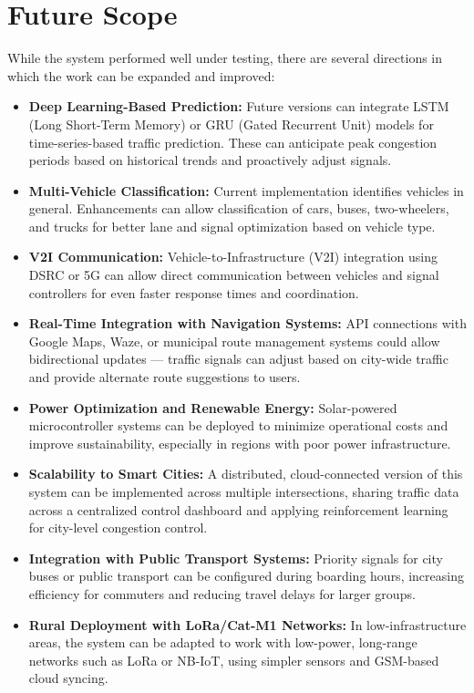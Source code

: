 \documentclass[12pt]{report}
\begin{document}
\section{Future Scope}

While the system performed well under testing, there are several directions in which the work can be expanded and improved:

\begin{itemize}
    \item \textbf{Deep Learning-Based Prediction:} Future versions can integrate LSTM (Long Short-Term Memory) or GRU (Gated Recurrent Unit) models for time-series-based traffic prediction. These can anticipate peak congestion periods based on historical trends and proactively adjust signals.

    \item \textbf{Multi-Vehicle Classification:} Current implementation identifies vehicles in general. Enhancements can allow classification of cars, buses, two-wheelers, and trucks for better lane and signal optimization based on vehicle type.

    \item \textbf{V2I Communication:} Vehicle-to-Infrastructure (V2I) integration using DSRC or 5G can allow direct communication between vehicles and signal controllers for even faster response times and coordination.

    \item \textbf{Real-Time Integration with Navigation Systems:} API connections with Google Maps, Waze, or municipal route management systems could allow bidirectional updates — traffic signals can adjust based on city-wide traffic and provide alternate route suggestions to users.

    \item \textbf{Power Optimization and Renewable Energy:} Solar-powered microcontroller systems can be deployed to minimize operational costs and improve sustainability, especially in regions with poor power infrastructure.

    \item \textbf{Scalability to Smart Cities:} A distributed, cloud-connected version of this system can be implemented across multiple intersections, sharing traffic data across a centralized control dashboard and applying reinforcement learning for city-level congestion control.

    \item \textbf{Integration with Public Transport Systems:} Priority signals for city buses or public transport can be configured during boarding hours, increasing efficiency for commuters and reducing travel delays for larger groups.

    \item \textbf{Rural Deployment with LoRa/Cat-M1 Networks:} In low-infrastructure areas, the system can be adapted to work with low-power, long-range networks such as LoRa or NB-IoT, using simpler sensors and GSM-based cloud syncing.
\end{itemize}
\end{document}

